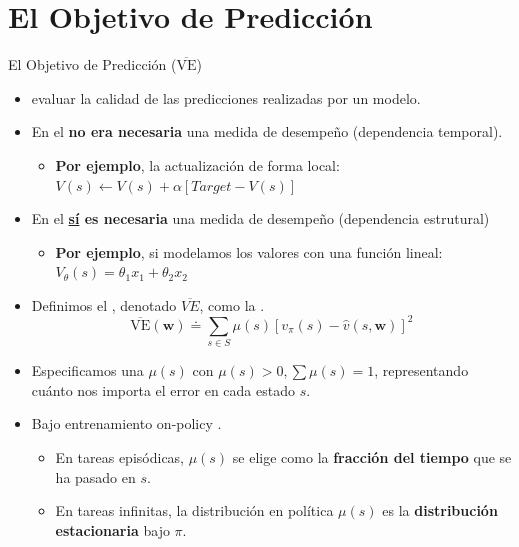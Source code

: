 \documentclass[10pt, envcountsect, handout, aspectratio=1610, hyperref={hypertexnames=true}]{beamer}
\begin{document}


\section{El Objetivo de Predicción}

\begin{frame}{El Objetivo de Predicción ($\overline{\text{VE}}$)}
	
\begin{itemize}
	\item {} evaluar la calidad de las predicciones realizadas por un modelo.
	
	\item En el  \textbf{no era necesaria} una medida de desempeño (dependencia temporal).
	
	\begin{itemize}
	\item  \textbf{Por ejemplo}, la actualización de forma local:$V(s) \leftarrow V(s) + \alpha [Target - V(s)]$
	\end{itemize}
	
	\item En el  \textbf{\underline{sí} es necesaria} una medida de desempeño (dependencia estrutural)
	
		\begin{itemize}
		\item  \textbf{Por ejemplo}, si modelamos los valores con una función lineal:  
				$
				V_\theta(s) = \theta_1 x_1 + \theta_2 x_2
				$ 
		\end{itemize}
	
	 

	
    \item Definimos el , denotado $\overline{VE}$, como la .
    \[
        \overline{\text{VE}}(\mathbf{w}) \doteq \sum_{s \in S} \mu(s) \left[ v_\pi(s) - \hat{v}(s, \mathbf{w}) \right]^2
    \]
    \item Especificamos una  $\mu(s)$ con $\mu(s) > 0, \sum \mu(s) = 1$, representando cuánto nos importa el error en cada estado $s$.
    
    \item Bajo entrenamiento on-policy .
    
   \begin{itemize}
   	 \item En tareas episódicas, $\mu(s)$ se elige como la \textbf{fracción del tiempo} que se ha pasado en $s$.

    \item En tareas infinitas, la distribución en política $\mu(s)$ es la \textbf{distribución estacionaria} bajo $\pi$.
   \end{itemize}
\end{itemize}

\end{frame}
\end{document}
